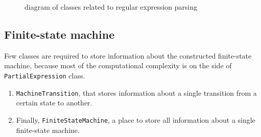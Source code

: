 \documentclass{article}
\begin{document}
\begin{figure}[ht!]
  \caption{diagram of classes related to regular expression parsing}
\end{figure}

\newpage

\subsection{Finite-state machine}
Few classes are required to store information about the constructed finite-state machine, because
most of the computational complexity is on the side of \verb|PartialExpression| class.

\begin{enumerate}

  \item \verb|MachineTransition|, that stores information about a single transition from a certain
  state to another.

  \item Finally, \verb|FiniteStateMachine|, a place to store all information about a single
  finite-state machine.

\end{enumerate}
\end{document}
